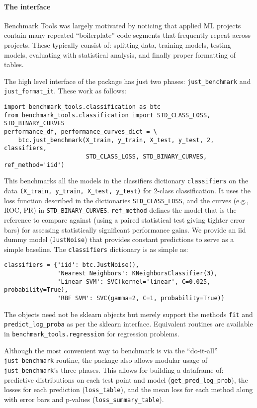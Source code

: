 \documentclass{article}
\newcommand{\code}{\texttt}
\newcommand{\sectionx}{\paragraph}
\begin{document}
\sectionx{The interface}
Benchmark Tools was largely motivated by noticing that applied ML projects contain many repeated ``boilerplate'' code segments that frequently repeat across projects.
These typically consist of: splitting data, training models, testing models, evaluating with statistical analysis, and finally proper formatting of tables.

The high level interface of the package has just two phases: \code{just\_benchmark} and \code{just\_format\_it}.
These work as follows:
\vspace{-2mm}
\begin{verbatim}
import benchmark_tools.classification as btc
from benchmark_tools.classification import STD_CLASS_LOSS, STD_BINARY_CURVES
performance_df, performance_curves_dict = \
    btc.just_benchmark(X_train, y_train, X_test, y_test, 2, classifiers,
                       STD_CLASS_LOSS, STD_BINARY_CURVES, ref_method='iid')
\end{verbatim}
\vspace{-2mm}
This benchmarks all the models in the classifiers dictionary \code{classifiers} on the data \code{(X\_train, y\_train, X\_test, y\_test)} for 2-class classification.
It uses the loss function described in the dictionaries \code{STD\_CLASS\_LOSS}, and the curves (e.g., ROC, PR) in \code{STD\_BINARY\_CURVES}.
\code{ref\_method} defines the model that is the reference to compare against (using a paired statistical test giving tighter error bars) for assessing statistically significant performance gains.
We provide an iid dummy model (\code{JustNoise}) that provides constant predictions to serve as a simple baseline.
The \code{classifiers} dictionary is as simple as:
\vspace{-2mm}
\begin{verbatim}
classifiers = {'iid': btc.JustNoise(),
               'Nearest Neighbors': KNeighborsClassifier(3),
               'Linear SVM': SVC(kernel='linear', C=0.025, probability=True),
               'RBF SVM': SVC(gamma=2, C=1, probability=True)}
\end{verbatim}
\vspace{-2mm}
The objects need not be sklearn objects but merely support the methods \code{fit} and \code{predict\_log\_proba} as per the sklearn interface.
Equivalent routines are available in \code{benchmark\_tools.regression} for regression problems.

Although the most convenient way to benchmark is via the ``do-it-all'' \code{just\_benchmark} routine, the package also allows modular usage of \code{just\_benchmark}'s three phases.
This allows for building a dataframe of: predictive distributions on each test point and model (\code{get\_pred\_log\_prob}), the losses for each prediction (\code{loss\_table}), and the mean loss for each method along with error bars and p-values (\code{loss\_summary\_table})\@.
\end{document}
